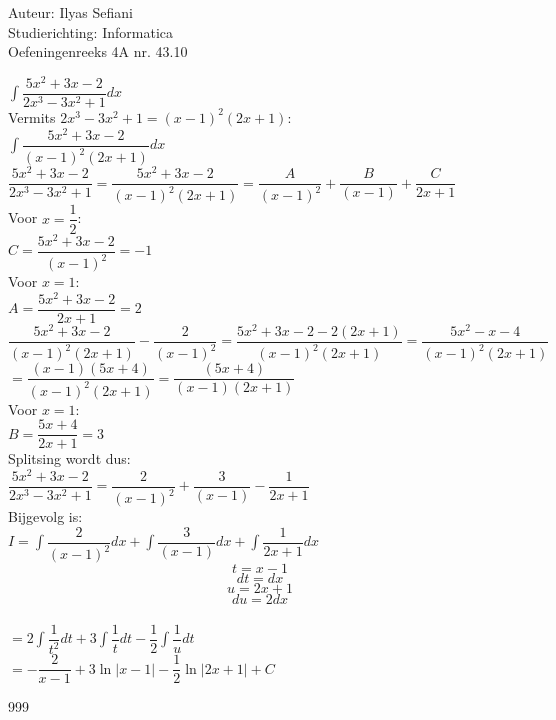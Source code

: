 \documentclass[a4paper]{article}
\begin{document}
\noindent \large Auteur: Ilyas Sefiani \\
\noindent \large Studierichting: Informatica\\
\noindent \large Oefeningenreeks 4A nr. 43.10\\

\medskip

\normalsize

$\displaystyle\int \dfrac{5x^2+3x-2}{2x^3-3x^2+1}dx$\\

Vermits $2x^3-3x^2+1=(x-1)^2(2x+1)$:\\

$\displaystyle\int \dfrac{5x^2+3x-2}{(x-1)^2(2x+1)}dx$\\

$\dfrac{5x^2+3x-2}{2x^3-3x^2+1}=\dfrac{5x^2+3x-2}{(x-1)^2(2x+1)}=\dfrac{A}{(x-1)^2}+\dfrac{B}{(x-1)}+\dfrac{C}{2x+1}$\\

Voor $x = \dfrac{1}{2}$:\\

$C = \dfrac{5x^2+3x-2}{(x-1)^2} = -1$\\

Voor $x = 1$:\\

$A = \dfrac{5x^2+3x-2}{2x+1} = 2$\\

$\dfrac{5x^2+3x-2}{(x-1)^2(2x+1)}-\dfrac{2}{(x-1)^2}=\dfrac{5x^2+3x-2-2(2x+1)}{(x-1)^2(2x+1)} = \dfrac{5x^2-x-4}{(x-1)^2(2x+1)}$\\

$=\dfrac{(x-1)(5x+4)}{(x-1)^2(2x+1)}=\dfrac{(5x+4)}{(x-1)(2x+1)}$\\

Voor $x = 1$:\\

$B = \dfrac{5x+4}{2x+1} = 3$\\

Splitsing wordt dus:\\

$\dfrac{5x^2+3x-2}{2x^3-3x^2+1}=\dfrac{2}{(x-1)^2}+\dfrac{3}{(x-1)}-\dfrac{1}{2x+1}$\\

Bijgevolg is:\\

$I = \displaystyle\int \dfrac{2}{(x-1)^2}dx + \displaystyle\int \dfrac{3}{(x-1)}dx+ \displaystyle\int \dfrac{1}{2x+1}dx$\\

$$t=x-1$$ $$dt=dx$$ $$u=2x+1$$ $$du=2dx$$\\

$= 2\displaystyle\int \dfrac{1}{t^2}dt + 3\displaystyle\int \dfrac{1}{t}dt - \dfrac{1}{2}\displaystyle\int \dfrac{1}{u}dt$\\

$= -\dfrac{2}{x-1} + 3\ln|x-1| - \dfrac{1}{2}\ln|2x+1| + C$\\

\begin{thebibliography}{999}
\end{thebibliography}
\end{document}
